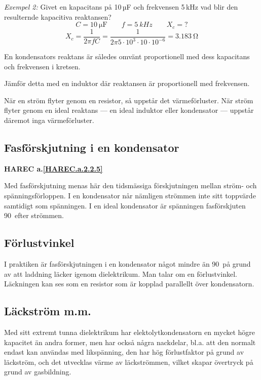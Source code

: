 \noindent\emph{Exempel 2:} Givet en kapacitans på 10\,µF och frekvensen 5\,kHz vad blir den resulternde kapacitiva reaktansen?
\[ C = \SI{10}{\micro\farad} \qquad f = \SI{5}{kHz} \qquad X_c = ? \]
\[
X_c = \frac{1}{2\pi f C} = \frac{1}{2\pi 5 \cdot 10^3 \cdot 10 \cdot 10^{-6}}
= \SI{3,183}{\ohm}
\]


En kondensators reaktans är således omvänt proportionell med dess kapacitans
och frekvensen i kretsen.

Jämför detta med en induktor där reaktansen är proportionell med frekvensen.

När en ström flyter genom en resistor, så uppstår det värmeförluster. När ström
flyter genom en ideal reaktans --- en ideal induktor eller kondensator --- uppstår
däremot inga värmeförluster.

\subsection{Fasförskjutning i en kondensator}
\textbf{HAREC a.\ref{HAREC.a.2.2.5}\label{myHAREC.a.2.2.5}}

Med fasförskjutning menas här den tidsmässiga förskjutningen mellan ström- och
spänningsförloppen. I en kondensator når nämligen strömmen inte sitt toppvärde
samtidigt som spänningen.
I en ideal kondensator är spänningen fasförskjuten 90\degree~efter strömmen.

\subsection{Förlustvinkel}

I praktiken är fasförskjutningen i en kondensator något mindre än 90\degree\ på
grund av att laddning läcker igenom dielektrikum. Man talar om en förlustvinkel.
Läckningen kan ses som en resistor som är kopplad parallellt över kondensatorn.

\subsection{Läckström m.m.}

Med sitt extremt tunna dielektrikum har elektolytkondensatorn en mycket högre
kapacitet än andra former, men har också några nackdelar, bl.a. att den normalt
endast kan användas med likspänning, den har hög förlustfaktor på grund av läckström,
och det utvecklas värme av läckströmmen, vilket skapar övertryck på grund av
gasbildning.

